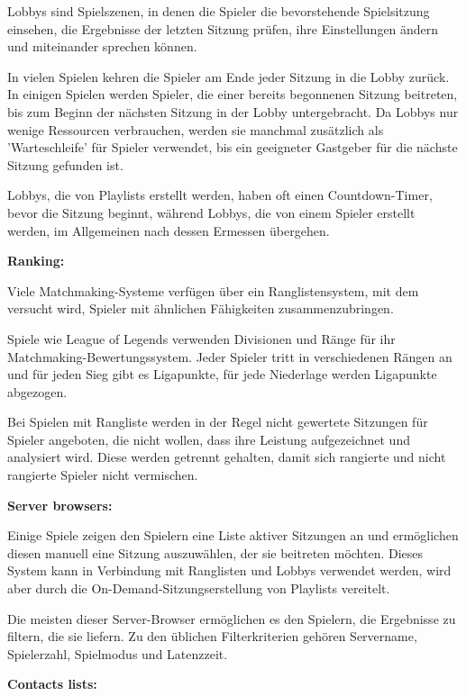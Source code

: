 Lobbys sind Spielszenen, in denen die Spieler die bevorstehende Spielsitzung einsehen, die Ergebnisse der letzten Sitzung prüfen, ihre Einstellungen ändern und miteinander sprechen können.

In vielen Spielen kehren die Spieler am Ende jeder Sitzung in die Lobby zurück. In einigen Spielen werden Spieler, die einer bereits begonnenen Sitzung beitreten, bis zum Beginn der nächsten Sitzung in der Lobby untergebracht. Da Lobbys nur wenige Ressourcen verbrauchen, werden sie manchmal zusätzlich als 'Warteschleife' für Spieler verwendet, bis ein geeigneter Gastgeber für die nächste Sitzung gefunden ist.

Lobbys, die von Playlists erstellt werden, haben oft einen Countdown-Timer, bevor die Sitzung beginnt, während Lobbys, die von einem Spieler erstellt werden, im Allgemeinen nach dessen Ermessen übergehen.

\cite{Wikipedia.2021b}

\textbf{Ranking:}

Viele Matchmaking-Systeme verfügen über ein Ranglistensystem, mit dem versucht wird, Spieler mit ähnlichen Fähigkeiten zusammenzubringen.

Spiele wie League of Legends verwenden Divisionen und Ränge für ihr Matchmaking-Bewertungssystem. Jeder Spieler tritt in verschiedenen Rängen an und für jeden Sieg gibt es Ligapunkte, für jede Niederlage werden Ligapunkte abgezogen.

Bei Spielen mit Rangliste werden in der Regel nicht gewertete Sitzungen für Spieler angeboten, die nicht wollen, dass ihre Leistung aufgezeichnet und analysiert wird. Diese werden getrennt gehalten, damit sich rangierte und nicht rangierte Spieler nicht vermischen.

\cite{Wikipedia.2021b}

\textbf{Server browsers:}

Einige Spiele zeigen den Spielern eine Liste aktiver Sitzungen an und ermöglichen diesen manuell eine Sitzung auszuwählen, der sie beitreten möchten. Dieses System kann in Verbindung mit Ranglisten und Lobbys verwendet werden, wird aber durch die On-Demand-Sitzungserstellung von Playlists vereitelt.

Die meisten dieser Server-Browser ermöglichen es den Spielern, die Ergebnisse zu filtern, die sie liefern. Zu den üblichen Filterkriterien gehören Servername, Spielerzahl, Spielmodus und Latenzzeit. 

\cite{Wikipedia.2021b}

\textbf{Contacts lists:}

